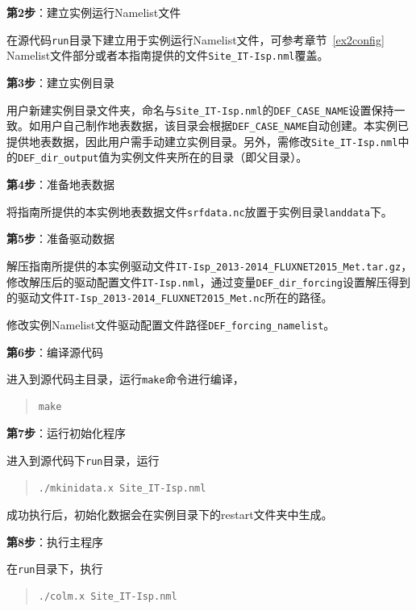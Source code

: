 \bigskip
\textbf{第2步}：建立实例运行Namelist文件

在源代码\texttt{run}目录下建立用于实例运行Namelist文件，可参考章节~\ref{ex2config} Namelist文件部分或者本指南提供的文件\texttt{Site\_IT-Isp.nml}覆盖。

\bigskip
\textbf{第3步}：建立实例目录

用户新建实例目录文件夹，命名与\texttt{Site\_IT-Isp.nml}的\texttt{DEF\_CASE\_NAME}设置保持一致。如用户自己制作地表数据，该目录会根据\texttt{DEF\_CASE\_NAME}自动创建。本实例已提供地表数据，因此用户需手动建立实例目录。另外，需修改\texttt{Site\_IT-Isp.nml}中的\texttt{DEF\_dir\_output}值为实例文件夹所在的目录（即父目录）。

\bigskip
\textbf{第4步}：准备地表数据

将指南所提供的本实例地表数据文件\texttt{srfdata.nc}放置于实例目录\texttt{landdata}下。

\bigskip
\textbf{第5步}：准备驱动数据

解压指南所提供的本实例驱动文件\texttt{IT-Isp\_2013-2014\_FLUXNET2015\_Met.tar.gz}，修改解压后的驱动配置文件\texttt{IT-Isp.nml}，通过变量\texttt{DEF\_dir\_forcing}设置解压得到的驱动文件\texttt{IT-Isp\_2013-2014\_FLUXNET2015\_Met.nc}所在的路径。

修改实例Namelist文件驱动配置文件路径\texttt{DEF\_forcing\_namelist}。

\bigskip
\textbf{第6步}：编译源代码

进入到源代码主目录，运行\texttt{make}命令进行编译，
\begin{quote}
\begin{lstlisting}
make
\end{lstlisting}
\end{quote}

\bigskip
\textbf{第7步}：运行初始化程序

进入到源代码下\texttt{run}目录，运行
\begin{quote}
\begin{lstlisting}
./mkinidata.x Site_IT-Isp.nml
\end{lstlisting}
\end{quote}

成功执行后，初始化数据会在实例目录下的restart文件夹中生成。

\bigskip
\textbf{第8步}：执行主程序

在\texttt{run}目录下，执行
\begin{quote}
\begin{lstlisting}
./colm.x Site_IT-Isp.nml
\end{lstlisting}
\end{quote}

